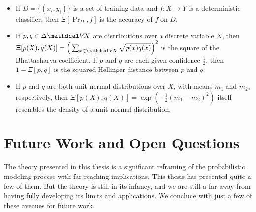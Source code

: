 \begin{itemize}
    \item If $D = \{(x_i, y_i) \}$ is a set of training data and $f : X \to Y$ is a
        deterministic classifier, 
        then 
        $\Xi[\Pr_D, f ]$ is the accuracy of $f$ on $D$. 
    
    \item If $p, q \in \Delta \V\!X$ are distributions over a discrete variable $X$, then
        $\Xi[ p(X), q(X)] = \Big( \sum_{x \in \V\!X} \sqrt{p(x) q(x)} \Big)^2$ is the square of the Bhattacharya coefficient. 
        If $p$ and $q$ are each given confidence $\frac12$, then $1-\Xi[p,q]$ is the squared Hellinger distance between $p$ and $q$. 

    \item 
        If $p$ and $q$ are both unit normal distributions over $X$, 
        with means $m_1$ and $m_2$, respectively, then
        $\Xi[ p(X), q(X) ] = \exp( - \frac12 (m_1 - m_2)^2)$
        itself resembles the density of a unit normal distribution.        
\end{itemize}


\section{Future Work and Open Questions}

The theory presented in this thesis is a significant reframing of the probabilistic modeling process with far-reaching implications.
This thesis has presented quite a few of them. 
But the theory is still in its infancy, 
    and we are still a far away from having fully developing its limits and applications. 
We conclude with just a few of these avenues for future work.

